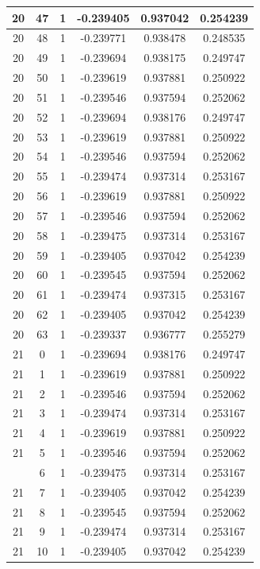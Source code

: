 \documentclass[12pt,a4paper]{article}
\numberwithin{equation}{section}
\numberwithin{figure}{section}
\numberwithin{table}{section}
\begin{document}
\begin{longtable}{|c|c|c|c|c|c|}
20 & 47 & 1 & -0.239405 & 0.937042 & 0.254239 \\ \hline
20 & 48 & 1 & -0.239771 & 0.938478 & 0.248535 \\ \hline
20 & 49 & 1 & -0.239694 & 0.938175 & 0.249747 \\ \hline
20 & 50 & 1 & -0.239619 & 0.937881 & 0.250922 \\ \hline
20 & 51 & 1 & -0.239546 & 0.937594 & 0.252062 \\ \hline
20 & 52 & 1 & -0.239694 & 0.938176 & 0.249747 \\ \hline
20 & 53 & 1 & -0.239619 & 0.937881 & 0.250922 \\ \hline
20 & 54 & 1 & -0.239546 & 0.937594 & 0.252062 \\ \hline
20 & 55 & 1 & -0.239474 & 0.937314 & 0.253167 \\ \hline
20 & 56 & 1 & -0.239619 & 0.937881 & 0.250922 \\ \hline
20 & 57 & 1 & -0.239546 & 0.937594 & 0.252062 \\ \hline
20 & 58 & 1 & -0.239475 & 0.937314 & 0.253167 \\ \hline
20 & 59 & 1 & -0.239405 & 0.937042 & 0.254239 \\ \hline
20 & 60 & 1 & -0.239545 & 0.937594 & 0.252062 \\ \hline
20 & 61 & 1 & -0.239474 & 0.937315 & 0.253167 \\ \hline
20 & 62 & 1 & -0.239405 & 0.937042 & 0.254239 \\ \hline
20 & 63 & 1 & -0.239337 & 0.936777 & 0.255279 \\ \hline
21 & 0 & 1 & -0.239694 & 0.938176 & 0.249747 \\ \hline
21 & 1 & 1 & -0.239619 & 0.937881 & 0.250922 \\ \hline
21 & 2 & 1 & -0.239546 & 0.937594 & 0.252062 \\ \hline
21 & 3 & 1 & -0.239474 & 0.937314 & 0.253167 \\ \hline
21 & 4 & 1 & -0.239619 & 0.937881 & 0.250922 \\ \hline
21 & 5 & 1 & -0.239546 & 0.937594 & 0.252062 \\ \hline
\pagebreak
21 & 6 & 1 & -0.239475 & 0.937314 & 0.253167 \\ \hline
21 & 7 & 1 & -0.239405 & 0.937042 & 0.254239 \\ \hline
21 & 8 & 1 & -0.239545 & 0.937594 & 0.252062 \\ \hline
21 & 9 & 1 & -0.239474 & 0.937314 & 0.253167 \\ \hline
21 & 10 & 1 & -0.239405 & 0.937042 & 0.254239 \\ \hline

\end{longtable}
\end{document}
